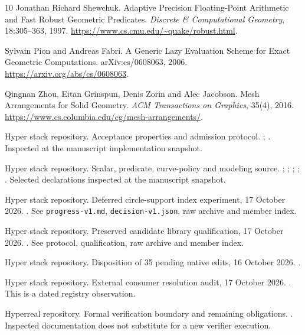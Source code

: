 \documentclass[11pt]{article}
\begin{document}
\begin{thebibliography}{10}
\small\setlength{\itemsep}{2pt}
Jonathan Richard Shewchuk.
Adaptive Precision Floating-Point Arithmetic and Fast Robust Geometric Predicates.
\emph{Discrete \& Computational Geometry}, 18:305--363, 1997.
\url{https://www.cs.cmu.edu/~quake/robust.html}.

Sylvain Pion and Andreas Fabri.
A Generic Lazy Evaluation Scheme for Exact Geometric Computations.
arXiv:cs/0608063, 2006.
\url{https://arxiv.org/abs/cs/0608063}.

Qingnan Zhou, Eitan Grinspun, Denis Zorin and Alec Jacobson.
Mesh Arrangements for Solid Geometry.
\emph{ACM Transactions on Graphics}, 35(4), 2016.
\url{https://www.cs.columbia.edu/cg/mesh-arrangements/}.

Hyper stack repository. Acceptance properties and admission protocol.
; .
Inspected at the manuscript implementation snapshot.

Hyper stack repository. Scalar, predicate, curve-policy and modeling source.
;
;
;
; .
Selected declarations inspected at the manuscript snapshot.

Hyper stack repository. Deferred circle-support index experiment, 17 October 2026.
.
See \texttt{progress-v1.md}, \texttt{decision-v1.json}, raw archive and member index.

Hyper stack repository. Preserved candidate library qualification, 17 October 2026.
.
See protocol, qualification, raw archive and member index.

Hyper stack repository. Disposition of 35 pending native edits, 16 October 2026.
.

Hyper stack repository. External consumer resolution audit, 17 October 2026.
.
This is a dated registry observation.

Hyperreal repository. Formal verification boundary and remaining obligations.
.
Inspected documentation does not substitute for a new verifier execution.
\end{thebibliography}
\end{document}
